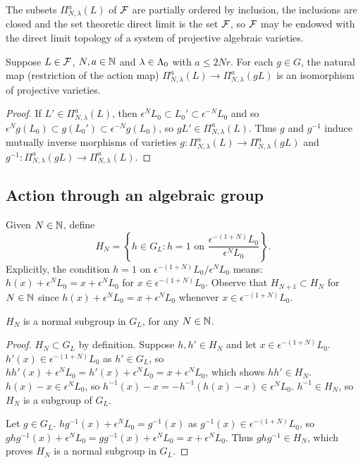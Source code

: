 \documentclass[a4paper, 11pt]{report}
\begin{document}
\begin{remark}{\color{blue}
The subsets $\Pi_{N,\lambda}^a(L)$ of $\mathcal{F}$ are partially ordered by inclusion, the inclusions are closed and the set theoretic direct limit is the set $\mathcal{F}$, so $\mathcal{F}$ may be endowed with the direct limit topology of a system of projective algebraic varieties.}
\end{remark}

\begin{lemma}
Suppose $L\in\mathcal{F}$, $N,a \in\mathbb{N}$ and $\lambda\in{\Lambda_0}$ with $a\le 2Nr$. For each $g\in G$, the natural map (restriction of the action map) $\Pi_{N,\lambda}^a(L)\to \Pi_{N,\lambda}^a(gL)$ is an isomorphism of projective varieties.
\end{lemma}

\begin{proof}
If $L'\in\Pi_{N,\lambda}^a(L)$, then $\epsilon^N L_0\subset L_0'\subset \epsilon^{-N}L_0$ and so $\epsilon^N g(L_0)\subset g(L_0')\subset \epsilon^{-N}g(L_0)$, so $gL'\in\Pi_{N,\lambda}^a(L)$. Thus $g$ and $g^{-1}$ induce mutually inverse morphisms of varieties $g\colon\Pi_{N,\lambda}^a(L)\to\Pi_{N,\lambda}^a(gL)$ and $g^{-1}\colon\Pi_{N,\lambda}^a(gL)\to\Pi_{N,\lambda}^a(L)$.
\end{proof}

\subsection{Action through an algebraic group}

Given $N\in\mathbb{N}$, define
\begin{equation*}
H_N = \left\{ h\in G_L: h=1 \text{ on } \frac{\epsilon^{-(1+N)}L_0}{\epsilon^N L_0} \right\}.
\end{equation*}
Explicitly, the condition $h=1$ on $\epsilon^{-(1+N)}L_0/{\epsilon^N L_0}$ means: $h(x) + \epsilon^N L_0 = x + \epsilon^N L_0$ for $x\in\epsilon^{-(1+N)}L_0$. Observe that $H_{N+1}\subset H_N$ for $N\in\mathbb{N}$ since $h(x) + \epsilon^N L_0 = x + \epsilon^N L_0$ whenever $x\in\epsilon^{-(1+N)}L_0$.

\begin{lemma}
$H_N$ is a normal subgroup in $G_L$, for any $N\in\mathbb{N}$.
\end{lemma}

\begin{proof}
$H_N\subset G_L$ by definition. Suppose $h,h'\in H_N$ and let $x\in\epsilon^{-(1+N)}L_0$. $h'(x)\in\epsilon^{-(1+N)}L_0$ as $h'\in G_L$, so $hh'(x) + \epsilon^N L_0 = h'(x) + \epsilon^N L_0 = x + \epsilon^N L_0$, which shows $hh'\in H_N$. $h(x)-x\in\epsilon^N L_0$, so $h^{-1}(x) - x = -h^{-1}(h(x)-x)\in\epsilon^N L_0$. $h^{-1}\in H_N$, so $H_N$ is a subgroup of $G_L$.

Let $g\in G_L$. $hg^{-1}(x) + \epsilon^N L_0 = g^{-1}(x)$ as $g^{-1}(x)\in\epsilon^{-(1+N)}L_0$, so $ghg^{-1}(x) + \epsilon^N L_0 = gg^{-1}(x) + \epsilon^N L_0 = x + \epsilon^N L_0$. Thus $ghg^{-1}\in H_N$, which proves $H_N$ is a normal subgroup in $G_L$.
\end{proof}
\end{document}
